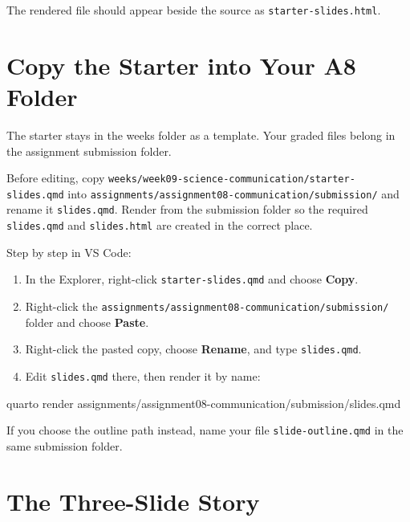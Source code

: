 \documentclass[
  letterpaper,
  DIV=11,
  numbers=noendperiod,
  oneside]{scrreprt}
\newenvironment{Shaded}{\begin{snugshade}}{\end{snugshade}}
\newcommand{\ExtensionTok}[1]{\textcolor[rgb]{0.00,0.23,0.31}{#1}}
\newcommand{\NormalTok}[1]{\textcolor[rgb]{0.00,0.23,0.31}{#1}}
\providecommand{\tightlist}{%
  \setlength{\itemsep}{0pt}\setlength{\parskip}{0pt}}
\begin{document}
The rendered file should appear beside the source as
\texttt{starter-slides.html}.

\section*{Copy the Starter into Your A8
Folder}\label{copy-the-starter-into-your-a8-folder}


The starter stays in the weeks folder as a template. Your graded files
belong in the assignment submission folder.

Before editing, copy
\texttt{weeks/week09-science-communication/starter-slides.qmd} into
\texttt{assignments/assignment08-communication/submission/} and rename
it \texttt{slides.qmd}. Render from the submission folder so the
required \texttt{slides.qmd} and \texttt{slides.html} are created in the
correct place.

Step by step in VS Code:

\begin{enumerate}
\def\labelenumi{\arabic{enumi}.}
\tightlist
\item
  In the Explorer, right-click \texttt{starter-slides.qmd} and choose
  \textbf{Copy}.
\item
  Right-click the
  \texttt{assignments/assignment08-communication/submission/} folder and
  choose \textbf{Paste}.
\item
  Right-click the pasted copy, choose \textbf{Rename}, and type
  \texttt{slides.qmd}.
\item
  Edit \texttt{slides.qmd} there, then render it by name:
\end{enumerate}

\begin{Shaded}
\begin{Highlighting}[numbers=left,,]
\ExtensionTok{quarto}\NormalTok{ render assignments/assignment08{-}communication/submission/slides.qmd}
\end{Highlighting}
\end{Shaded}

If you choose the outline path instead, name your file
\texttt{slide-outline.qmd} in the same submission folder.

\section*{The Three-Slide Story}\label{the-three-slide-story}
\end{document}
